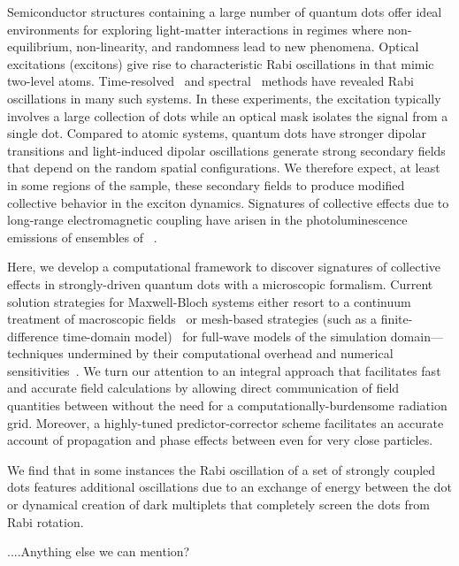 Semiconductor structures containing a large number of quantum dots offer ideal environments for exploring light-matter interactions in regimes where non-equilibrium, non-linearity, and randomness lead to new phenomena.
Optical excitations (excitons) give rise to characteristic Rabi oscillations in \qds{} that mimic two-level atoms.
Time-resolved~\cite{stievater,shih} and spectral~\cite{kamada} methods have revealed Rabi oscillations in many such systems.
In these experiments, the excitation typically involves a large collection of dots while an optical mask isolates the signal from a single dot.
Compared to atomic systems, quantum dots have stronger dipolar transitions and light-induced dipolar oscillations generate strong secondary fields that  depend on the random spatial configurations.
We therefore expect, at least in some regions of the sample, these secondary fields to produce modified collective behavior in the exciton dynamics.
Signatures of collective effects due to long-range electromagnetic coupling have arisen in the photoluminescence emissions of ensembles of \qds{}~\cite{forchel}.

Here, we develop a computational framework to discover signatures of collective effects in strongly-driven quantum dots with a microscopic formalism.
Current solution strategies for Maxwell-Bloch systems either resort to a continuum treatment of macroscopic fields~\cite{} or mesh-based strategies (such as a finite-difference time-domain model)~\cite{Vanneste2001, Fratalocchi2008} for full-wave models of the simulation domain---techniques undermined by their computational overhead and numerical sensitivities~\cite{Baczewski2013}.
We turn our attention to an integral approach that facilitates fast and accurate field calculations by allowing direct communication of field quantities between \qds{} without the need for a computationally-burdensome radiation grid.
Moreover, a highly-tuned predictor-corrector scheme facilitates an accurate account of propagation and phase effects between \qds{} even for very close particles. 

We find that in some instances the Rabi oscillation of a set of strongly coupled dots features additional oscillations due to an exchange of energy between the dot or dynamical creation of dark multiplets that completely screen the dots from Rabi rotation.


....Anything else we can mention?

